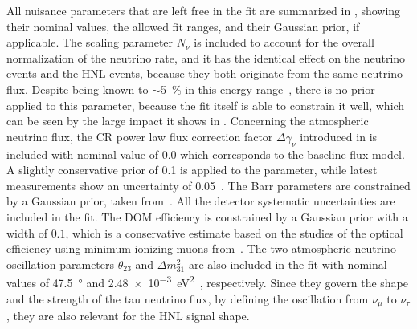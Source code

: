 All nuisance parameters that are left free in the fit are summarized in , showing their nominal values, the allowed fit ranges, and their Gaussian prior, if applicable. The scaling parameter $N_{\nu}$ is included to account for the overall normalization of the neutrino rate, and it has the identical effect on the neutrino events and the HNL events, because they both originate from the same neutrino flux. Despite being known to $\sim$\SI{5}{\percent} in this energy range~\cite{PhysRevD.92.023004_Honda_Flux}, there is no prior applied to this parameter, because the fit itself is able to constrain it well, which can be seen by the large impact it shows in . Concerning the atmospheric neutrino flux, the CR power law flux correction factor $\Delta \gamma_\nu$ introduced in  is included with nominal value of 0.0 which corresponds to the baseline flux model. A slightly conservative prior of 0.1 is applied to the parameter, while latest measurements show an uncertainty of 0.05~. The Barr parameters are constrained by a Gaussian prior, taken from~\cite{Barr:2006it}. All the detector systematic uncertainties are included in the fit. The DOM efficiency is constrained by a Gaussian prior with a width of $0.1$, which is a conservative estimate based on the studies of the optical efficiency using minimum ionizing muons from~\cite{JFeintzeig_phd, domeff_nick}. The two atmospheric neutrino oscillation parameters $\theta_{23}$ and $\Delta m^{2}_{31}$ are also included in the fit with nominal values of \SI{47.5}{\degree} and \SI{2.48e-3}{\electronvolt^2}~\cite{flercnn_analysis_result}, respectively. Since they govern the shape and the strength of the tau neutrino flux, by defining the oscillation from $\nu_\mu$ to $\nu_\tau$, they are also relevant for the HNL signal shape.

